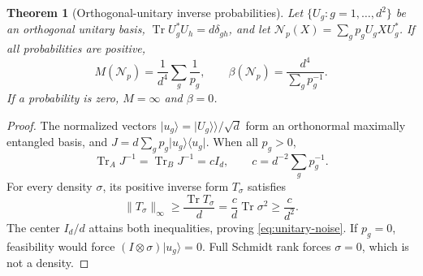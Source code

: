 \documentclass[11pt]{article}
\numberwithin{equation}{section}
\newtheorem{theorem}{Theorem}[section]
\theoremstyle{definition}
\theoremstyle{remark}
\DeclareMathOperator{\Tr}{Tr}
\newcommand{\N}{\mathcal N}
\newcommand{\ket}[1]{\lvert #1\rangle}
\newcommand{\bra}[1]{\langle #1\rvert}
\newcommand{\norm}[1]{\lVert #1\rVert}
\begin{document}
\begin{theorem}[Orthogonal-unitary inverse probabilities]
\label{thm:error-basis}
Let $\{U_g:g=1,\ldots,d^2\}$ be an orthogonal unitary basis,
$\Tr U_g^*U_h=d\delta_{gh}$, and let
$\N_p(X)=\sum_g p_gU_gXU_g^*$.
If all probabilities are positive,
\begin{equation}
 M(\N_p)=\frac1{d^4}\sum_g\frac1{p_g},\qquad
 \beta(\N_p)=\frac{d^4}{\sum_g p_g^{-1}}.
 \label{eq:unitary-noise}
\end{equation}
If a probability is zero, $M=\infty$ and $\beta=0$.
\end{theorem}
\begin{proof}
The normalized vectors
$\ket{u_g}=\ket{U_g}\!\rangle/\sqrt d$ form an orthonormal
maximally entangled basis, and
$J=d\sum_g p_g\ket{u_g}\bra{u_g}$.
When all $p_g>0$,
\[
 \Tr_AJ^{-1}=\Tr_BJ^{-1}=cI_d,\qquad
 c=d^{-2}\sum_g p_g^{-1}.
\]
For every density $\sigma$, its positive inverse form $T_\sigma$
satisfies
\[
 \norm{T_\sigma}_\infty
 \geq\frac{\Tr T_\sigma}{d}
 =\frac cd\Tr\sigma^2\geq\frac c{d^2}.
\]
The center $I_d/d$ attains both inequalities, proving
\eqref{eq:unitary-noise}. If $p_g=0$, feasibility would force
$(I\otimes\sigma)\ket{u_g}=0$. Full Schmidt rank forces
$\sigma=0$, which is not a density.
\end{proof}
\end{document}
